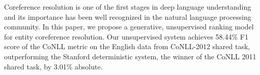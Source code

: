Coreference resolution is one of the first stages in deep language understanding and its importance has been well recognized in the natural language processing community. In this paper, we propose a generative, unsupervised ranking model for entity coreference resolution. Our unsupervised system achieves 58.44\% F1 score of the CoNLL metric on the English data from CoNLL-2012 shared task, outperforming the Stanford deterministic system, the winner of the CoNLL 2011 shared task, by 3.01\% absolute.
